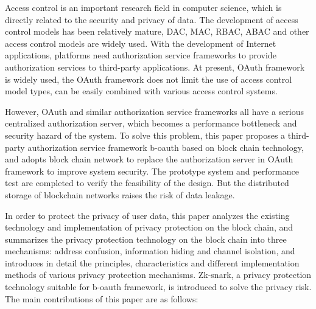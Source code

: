 \begin{abstract*}
  Access control is an important research field in computer science, which is directly related to the security and privacy of data. The development of access control models has been relatively mature, DAC, MAC, RBAC, ABAC and other access control models are widely used. With the development of Internet applications, platforms need authorization service frameworks to provide authorization services to third-party applications. At present, OAuth framework is widely used, the OAuth framework does not limit the use of access control model types, can be easily combined with various access control systems. 

  However, OAuth and similar authorization service frameworks all have a serious centralized authorization server, which becomes a performance bottleneck and security hazard of the system. To solve this problem, this paper proposes a third-party authorization service framework b-oauth based on block chain technology, and adopts block chain network to replace the authorization server in OAuth framework to improve system security. The prototype system and performance test are completed to verify the feasibility of the design. But the distributed storage of blockchain networks raises the risk of data leakage. 

  In order to protect the privacy of user data, this paper analyzes the existing technology and implementation of privacy protection on the block chain, and summarizes the privacy protection technology on the block chain into three mechanisms: address confusion, information hiding and channel isolation, and introduces in detail the principles, characteristics and different implementation methods of various privacy protection mechanisms. Zk-snark, a privacy protection technology suitable for b-oauth framework, is introduced to solve the privacy risk. The main contributions of this paper are as follows:


\end{abstract*}
